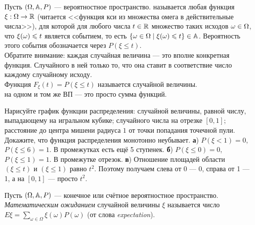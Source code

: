 \documentclass[a4paper,11pt]{article}
\begin{document}
Пусть $(\Omega,\mathbb{A}, P)$ --- вероятностное пространство.
 называется любая функция $\xi:\Omega\rightarrow\mathbb{R}$ (читается <<функция кси из множества омега в действительные числа>>), для которой для любого числа $t\in\mathbb{R}$ множество таких исходов
$\omega\in\Omega$, что $\xi(\omega)\leqslant t$ является событием, то есть $\{\omega\in\Omega\mid\xi(\omega)\leqslant t\}\in\mathbb{A}$.
Вероятность этого события обозначается через $P(\xi\le t)$.
\\Обратите внимание: каждая случайная величина — это вполне конкретная функция.
Случайного в ней только то, что она ставит в соответствие число каждому случайному исходу.
\\
Функция $F_\xi(t) = P(\xi\le t)$ называется  случайной величины.
\\
 на одном и том же ВП --- это просто сумма функций.




Нарисуйте график функции распределения:
  случайной величины, равной числу, выпадающему на игральном кубике;
  случайного числа на отрезке $[0,1]$;
  расстояние до центра мишени радиуса $1$ от точки попадания точечной пули.
  Докажите, что функция распределения монотонно неубывает.
\textbf{а}) $P(\xi < 1) = 0$, $P(\xi \le 6) = 1$. В промежутках есть ещё 5 ступенек.
\textbf{б}) $P(\xi \le 0) = 0$, $P(\xi \le 1) = 1$. В промежутке отрезок.
\textbf{в}) Отношение площадей области $(\xi\le t)$ и $(\xi\le 1)$ равно $t^2$.
Поэтому получаем слева от 0 — 0, справа от 1 — 1, а на $[0,1]$ — просто $t^2$.


Пусть $(\Omega,\mathbb{A}, P)$ --- конечное или счётное вероятностное пространство.
\emph{Математическим ожиданием} случайной величины $\xi$ называется число
$E\xi = \sum\limits_{\omega \in \Omega} \xi(\omega) P(\omega)$ (от слова \textit{expectation}).
\end{document}

